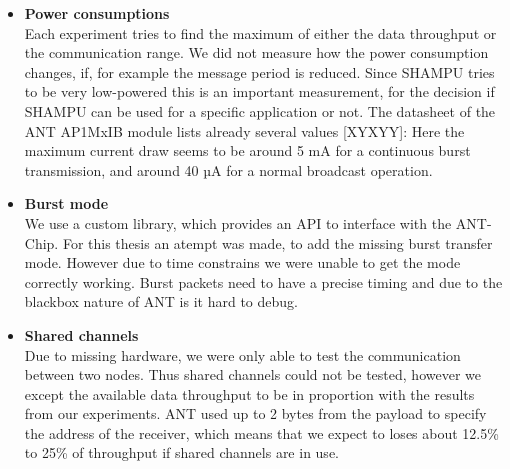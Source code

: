 \begin{itemize}
	\item{\textbf{Power consumptions}} \hfill \\ Each experiment tries to find the maximum of either the data throughput or the communication range. We did not measure how the power consumption changes, if, for example the message period is reduced. Since SHAMPU tries to be very low-powered this is an important measurement, for the decision if SHAMPU can be used for a specific application or not. The datasheet of the ANT AP1MxIB module lists already several values [XYXYY]: Here the maximum current draw seems to be around 5 mA for a continuous burst transmission, and around 40 µA for a normal broadcast operation.
	\item{\textbf{Burst mode}} \hfill \\ We use a custom library, which provides an API to interface with the ANT-Chip. For this thesis an atempt was made, to add the missing burst transfer mode. However due to time constrains we were unable to get the mode correctly working. Burst packets need to have a precise timing and due to the blackbox nature of ANT is it hard to debug.
	\item{\textbf{Shared channels}} \hfill \\ Due to missing hardware, we were only able to test the communication between two nodes. Thus shared channels could not be tested, however we except the available data throughput to be in proportion with the results from our experiments. ANT used up to 2 bytes from the payload to specify the address of the receiver, which means that we expect to loses about 12.5\% to 25\% of throughput if shared channels are in use.
\end{itemize}